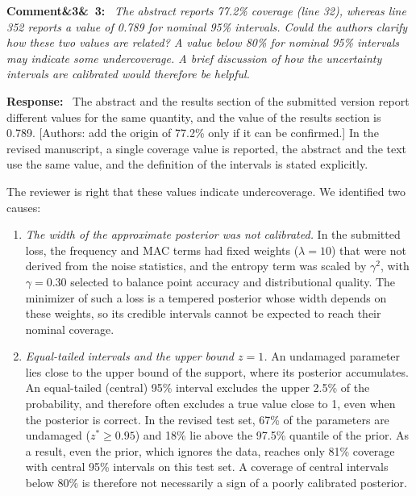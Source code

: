 \documentclass[11pt]{article}
\newenvironment{rcomment}[1]{\par\bigskip\noindent\textbf{Comment\ifx&#1&\else\ #1\fi:}\ \itshape}{\par}
\newenvironment{response}{\par\smallskip\noindent\color{resp}\textbf{Response:}\ }{\par}
\newcommand{\authornote}[1]{\textcolor{note}{\textsf{[Authors: #1]}}}
\begin{document}
\begin{rcomment}{3}
The abstract reports 77.2\% coverage (line 32), whereas line 352 reports a value of 0.789 for nominal 95\% intervals.
Could the authors clarify how these two values are related? A value below 80\% for nominal 95\% intervals may indicate
some undercoverage. A brief discussion of how the uncertainty intervals are calibrated would therefore be helpful.
\end{rcomment}

\begin{response}
The abstract and the results section of the submitted version
report different values for the same quantity, and the value of the results section is 0.789.
\authornote{add the origin of 77.2\% only if it can be confirmed.} In the revised manuscript, a single coverage value is
reported, the abstract and the text use the same value, and the definition of the intervals is stated explicitly.

The reviewer is right that these values indicate undercoverage. We identified two causes:
\begin{enumerate}[leftmargin=*]
\item \emph{The width of the approximate posterior was not calibrated.} In the submitted loss, the frequency and MAC
terms had fixed weights ($\lambda=10$) that were not derived from the noise statistics, and the entropy term was
scaled by $\gamma^2$, with $\gamma=0.30$ selected to balance point accuracy and distributional quality. The minimizer of such a loss is a tempered posterior
whose width depends on these weights, so its credible intervals cannot be expected to reach their nominal coverage.
\item \emph{Equal-tailed intervals and the upper bound $z=1$.} An undamaged parameter lies close to the upper bound of
the support, where its posterior accumulates. An equal-tailed (central) 95\% interval excludes the upper 2.5\% of the
probability, and therefore often excludes a true value close to 1, even when the posterior is correct. In the revised
test set, 67\% of the parameters are undamaged ($z^*\ge0.95$) and 18\% lie above the 97.5\% quantile of the prior. As a
result, even the prior, which ignores the data, reaches only 81\% coverage with central 95\% intervals on this test set.
A coverage of central intervals below 80\% is therefore not necessarily a sign of a poorly calibrated posterior.
\end{enumerate}


\end{response}
\end{document}
